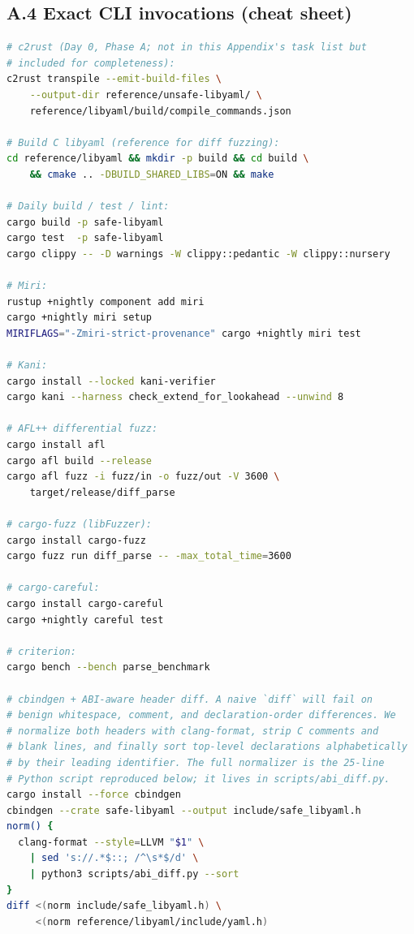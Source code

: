\documentclass[12pt]{article}
\theoremstyle{definition}
\theoremstyle{remark}
\begin{document}
\subsection*{A.4 Exact CLI invocations (cheat sheet)}

\begin{lstlisting}[language=bash]
# c2rust (Day 0, Phase A; not in this Appendix's task list but
# included for completeness):
c2rust transpile --emit-build-files \
    --output-dir reference/unsafe-libyaml/ \
    reference/libyaml/build/compile_commands.json

# Build C libyaml (reference for diff fuzzing):
cd reference/libyaml && mkdir -p build && cd build \
    && cmake .. -DBUILD_SHARED_LIBS=ON && make

# Daily build / test / lint:
cargo build -p safe-libyaml
cargo test  -p safe-libyaml
cargo clippy -- -D warnings -W clippy::pedantic -W clippy::nursery

# Miri:
rustup +nightly component add miri
cargo +nightly miri setup
MIRIFLAGS="-Zmiri-strict-provenance" cargo +nightly miri test

# Kani:
cargo install --locked kani-verifier
cargo kani --harness check_extend_for_lookahead --unwind 8

# AFL++ differential fuzz:
cargo install afl
cargo afl build --release
cargo afl fuzz -i fuzz/in -o fuzz/out -V 3600 \
    target/release/diff_parse

# cargo-fuzz (libFuzzer):
cargo install cargo-fuzz
cargo fuzz run diff_parse -- -max_total_time=3600

# cargo-careful:
cargo install cargo-careful
cargo +nightly careful test

# criterion:
cargo bench --bench parse_benchmark

# cbindgen + ABI-aware header diff. A naive `diff` will fail on
# benign whitespace, comment, and declaration-order differences. We
# normalize both headers with clang-format, strip C comments and
# blank lines, and finally sort top-level declarations alphabetically
# by their leading identifier. The full normalizer is the 25-line
# Python script reproduced below; it lives in scripts/abi_diff.py.
cargo install --force cbindgen
cbindgen --crate safe-libyaml --output include/safe_libyaml.h
norm() {
  clang-format --style=LLVM "$1" \
    | sed 's://.*$::; /^\s*$/d' \
    | python3 scripts/abi_diff.py --sort
}
diff <(norm include/safe_libyaml.h) \
     <(norm reference/libyaml/include/yaml.h)
\end{lstlisting}
\end{document}
